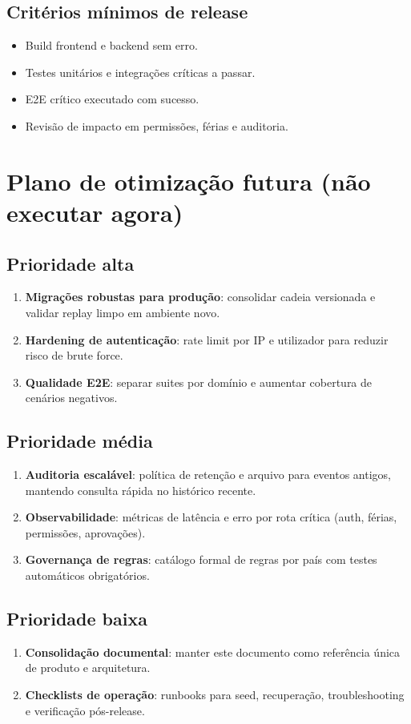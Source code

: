 \documentclass[11pt,a4paper]{article}
\begin{document}
\subsection{Critérios mínimos de release}
\begin{itemize}
  \item Build frontend e backend sem erro.
  \item Testes unitários e integrações críticas a passar.
  \item E2E crítico executado com sucesso.
  \item Revisão de impacto em permissões, férias e auditoria.
\end{itemize}

\section{Plano de otimização futura (não executar agora)}
\subsection{Prioridade alta}
\begin{enumerate}
  \item \textbf{Migrações robustas para produção}: consolidar cadeia versionada e validar replay limpo em ambiente novo.
  \item \textbf{Hardening de autenticação}: rate limit por IP e utilizador para reduzir risco de brute force.
  \item \textbf{Qualidade E2E}: separar suites por domínio e aumentar cobertura de cenários negativos.
\end{enumerate}

\subsection{Prioridade média}
\begin{enumerate}
  \item \textbf{Auditoria escalável}: política de retenção e arquivo para eventos antigos, mantendo consulta rápida no histórico recente.
  \item \textbf{Observabilidade}: métricas de latência e erro por rota crítica (auth, férias, permissões, aprovações).
  \item \textbf{Governança de regras}: catálogo formal de regras por país com testes automáticos obrigatórios.
\end{enumerate}

\subsection{Prioridade baixa}
\begin{enumerate}
  \item \textbf{Consolidação documental}: manter este documento como referência única de produto e arquitetura.
  \item \textbf{Checklists de operação}: runbooks para seed, recuperação, troubleshooting e verificação pós-release.
\end{enumerate}
\end{document}
